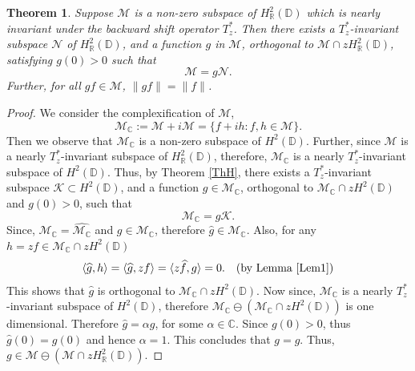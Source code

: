 \documentclass[11pt]{amsart}
\newtheorem{theorem}{Theorem}[section]
\numberwithin{equation}{section}
\begin{document}
\begin{theorem}\label{ThM1}
Suppose $\mathcal{M}$ is a non-zero subspace of $H_\mathbb{R}^2(\mathbb{D})$ which is nearly invariant under the backward shift operator $T^*_z$. Then there exists a $T^*_z$-invariant subspace $\mathcal{N}$ of $H_\mathbb{R}^2(\mathbb{D})$, and a function $g$ in $\mathcal{M}$, orthogonal to $\mathcal{M}\cap zH^2_\mathbb{R}(\mathbb{D})$, satisfying $g(0)>0$ such that $$\mathcal{M}=g\mathcal{N}.$$
Further, for all $gf \in \mathcal{M}$,  $\|gf\|=\|f\|$. 
\end{theorem}
\begin{proof}
We consider the complexification of $\mathcal{M}$, $$\mathcal{M}_\mathbb{C}:=\mathcal{M}+i\mathcal{M}=\{f+ih : f,h \in \mathcal{M}\}.$$
Then we observe that $\mathcal{M}_\mathbb{C}$ is a non-zero subspace of $H^2(\mathbb{D})$. Further,
since $\mathcal{M}$ is a nearly $T^*_z$-invariant subspace of $H^2_{\mathbb{R}}(\mathbb{D})$, therefore, $\mathcal{M}_\mathbb{C}$ is a nearly  $T^*_z$-invariant subspace of $H^2(\mathbb{D})$. Thus, by Theorem \ref{ThH}, there exists a $T^*_z$-invariant subspace $\mathcal{K} \subset H^2(\mathbb{D})$, and a function $g \in \mathcal{M}_{\mathbb{C}}$, orthogonal to $\mathcal{M}_\mathbb{C}\cap zH^2(\mathbb{D})$ and $g(0)>0$, such that $$\mathcal{M}_\mathbb{C}=g\mathcal{K}.$$
 Since, $\mathcal{M}_\mathbb{C}=\widehat{\mathcal{M}_\mathbb{C}}$ and $g \in \mathcal{M}_\mathbb{C}$, therefore $\widehat{g} \in \mathcal{M}_\mathbb{C}$. Also, for any $h=zf \in \mathcal{M}_\mathbb{C}\cap zH^2(\mathbb{D})$
 \begin{eqnarray*}
 \langle \widehat{g},h \rangle =\langle \widehat{g},zf \rangle = \langle z\widehat{f}, g \rangle = 0. &&\text{(by Lemma \ref{Lem1})}   
 \end{eqnarray*}
This shows that $\widehat{g}$ is orthogonal to  $\mathcal{M}_\mathbb{C}\cap zH^2(\mathbb{D})$. Now since, $\mathcal{M}_{\mathbb{C}}$ is a nearly $T^*_z$-invariant subspace of $H^2(\mathbb{D})$, therefore $\mathcal{M}_\mathbb{C}\ominus (\mathcal{M}_\mathbb{C}\cap zH^2(\mathbb{D})) $ is one dimensional. Therefore $\widehat{g}=\alpha g$, for some $\alpha \in \mathbb{C}$. Since $g(0)>0$, thus $\widehat{g}(0)=g(0)$ and hence $\alpha=1$. This concludes that $g=\widehat{g}$. Thus, $g\in \mathcal{M} \ominus (\mathcal{M}\cap zH^2_{\mathbb{R}}(\mathbb{D}))$. 


\end{proof}
\end{document}
